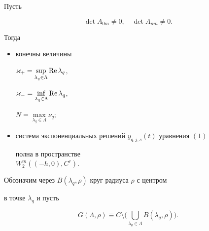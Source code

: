 \begin{lem}


Пусть


\begin{equation}


\det A_{0m}\ne 0,\quad \det A_{nm}\ne 0.


\end{equation}


Тогда


\begin{itemize}


\item[1)] конечны величины


$\varkappa_+=\sup\limits_{\lambda_q\in\Lambda}\operatorname{Re}\lambda_q$,


$\varkappa_-=\inf\limits_{\lambda_q\in\Lambda}\operatorname{Re}\lambda_q$,


$N=\max\limits_{\lambda_q\in\Lambda}\nu_q;$


\item[2)] система экспоненциальных решений ${y_{q,j,s}(t)}$ уравнения $(1)$


полна в пространстве\\ $W_2^m((-h,0),C^r)$.


\end{itemize}


\end{lem}








Обозначим через $B(\lambda_q,\rho)$ круг радиуса $\rho$ с центром


в точке $\lambda_q$ и пусть


$$


G(\Lambda,\rho)\equiv C\setminus


\Big(\bigcup\limits_{\lambda_q\in\Lambda}B(\lambda_q,\rho)\Big).


$$





